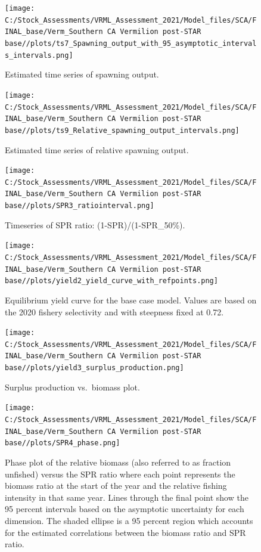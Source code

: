 \documentclass[11pt,
  english,
]{article}
\begin{document}
\FloatBarrier

\begin{figure}
\centering
\texttt{[image: C:/Stock\_Assessments/VRML\_Assessment\_2021/Model\_files/SCA/FINAL\_base/Verm\_Southern CA Vermilion post-STAR base//plots/ts7\_Spawning\_output\_with\_95\_asymptotic\_intervals\_intervals.png]}
\caption{Estimated time series of spawning output.\label{fig:spawnout}}
\end{figure}

\FloatBarrier

\begin{figure}
\centering
\texttt{[image: C:/Stock\_Assessments/VRML\_Assessment\_2021/Model\_files/SCA/FINAL\_base/Verm\_Southern CA Vermilion post-STAR base//plots/ts9\_Relative\_spawning\_output\_intervals.png]}
\caption{Estimated time series of relative spawning output.\label{fig:depl}}
\end{figure}

\FloatBarrier

\begin{figure}
\centering
\texttt{[image: C:/Stock\_Assessments/VRML\_Assessment\_2021/Model\_files/SCA/FINAL\_base/Verm\_Southern CA Vermilion post-STAR base//plots/SPR3\_ratiointerval.png]}
\caption{Timeseries of SPR ratio: (1-SPR)/(1-SPR\_50\%).\label{fig:1-spr}}
\end{figure}

\begin{figure}
\centering
\texttt{[image: C:/Stock\_Assessments/VRML\_Assessment\_2021/Model\_files/SCA/FINAL\_base/Verm\_Southern CA Vermilion post-STAR base//plots/yield2\_yield\_curve\_with\_refpoints.png]}
\caption{Equilibrium yield curve for the base case model. Values are based on the 2020 fishery selectivity and with steepness fixed at 0.72.\label{fig:yield2}}
\end{figure}

\begin{figure}
\centering
\texttt{[image: C:/Stock\_Assessments/VRML\_Assessment\_2021/Model\_files/SCA/FINAL\_base/Verm\_Southern CA Vermilion post-STAR base//plots/yield3\_surplus\_production.png]}
\caption{Surplus production vs.~biomass plot.\label{fig:yield3}}
\end{figure}

\FloatBarrier

\begin{figure}
\centering
\texttt{[image: C:/Stock\_Assessments/VRML\_Assessment\_2021/Model\_files/SCA/FINAL\_base/Verm\_Southern CA Vermilion post-STAR base//plots/SPR4\_phase.png]}
\caption{Phase plot of the relative biomass (also referred to as fraction unfished) versus the SPR ratio where each point represents the biomass ratio at the start of the year and the relative fishing intensity in that same year. Lines through the final point show the 95 percent intervals based on the asymptotic uncertainty for each dimension. The shaded ellipse is a 95 percent region which accounts for the estimated correlations between the biomass ratio and SPR ratio.\label{fig:phase}}
\end{figure}
\end{document}
